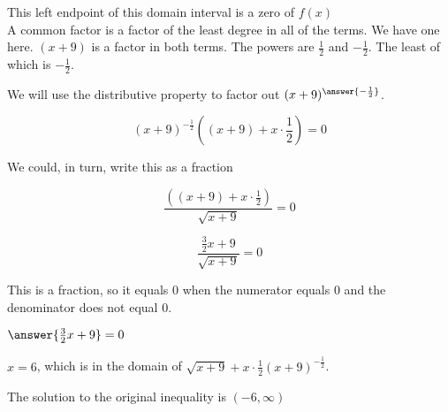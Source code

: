 \documentclass{ximera}
\begin{document}
\begin{example}
\begin{explanation}
This left endpoint of this domain interval is a zero of $f(x)$ \\ 






A common factor is a factor of the least degree in all of the terms.  We have one here. $(x+9)$ is a factor in both terms.  The powers are $\frac{1}{2}$ and $-\frac{1}{2}$. The least of which is $-\frac{1}{2}$.

We will use the distributive property to factor out $(x+9)^{\answer{-\frac{1}{2}}}$.


\[ (x+9)^{-\tfrac{1}{2}} \left((x+9) + x \cdot \frac{1}{2}\right)  = 0 \]


We could, in turn, write this as a fraction


\[ \frac{\left((x+9) + x \cdot \frac{1}{2}\right)}{\sqrt{x+9}} = 0 \]


\[ \frac{ \frac{3}{2} x + 9}{\sqrt{x+9}} = 0 \]



This is a fraction, so it equals $0$ when the numerator equals $0$ and the denominator does not equal $0$.


$\answer{\frac{3}{2} x + 9} = 0$



$x = 6$, which is in the domain of $\sqrt{x+9} + x \cdot \frac{1}{2} (x+9)^{-\tfrac{1}{2}}$.



The solution to the original inequality is $(-6, \infty)$


\end{explanation}

\end{example}
\end{document}
